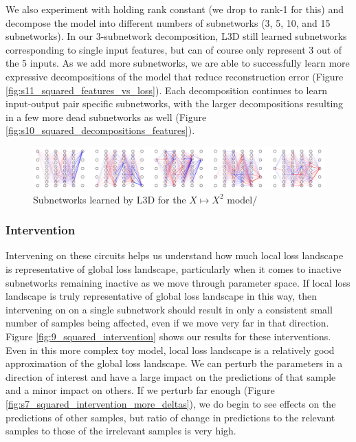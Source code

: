 \documentclass{article}
\theoremstyle{plain}
\theoremstyle{definition}
\theoremstyle{remark}
\begin{document}
We also experiment with holding rank constant (we drop to rank-1 for this) and decompose the model into different numbers of subnetworks (3, 5, 10, and 15 subnetworks). In our 3-subnetwork decomposition, L3D still learned subnetworks corresponding to single input features, but can of course only represent 3 out of the 5 inputs. As we add more subnetworks, we are able to successfully learn more expressive decompositions of the model that reduce reconstruction error (Figure \ref{fig:s11_squared_features_vs_loss}). Each decomposition continues to learn input-output pair specific subnetworks, with the larger decompositions resulting in a few more dead subnetworks as well (Figure \ref{fig:s10_squared_decompositions_features}).

\begin{figure}[htbp]
    \centerline{\includegraphics[width=\textwidth]{../figures/8_squared_subnetworks.pdf}}
    \centering
    \caption{Subnetworks learned by L3D for the $X \mapsto X^2$ model/}\label{fig:8_squared_subnetworks}
\end{figure}


\subsubsection{Intervention}

Intervening on these circuits helps us understand how much local loss landscape is representative of global loss landscape, particularly when it comes to inactive subnetworks remaining inactive as we move through parameter space. If local loss landscape is truly representative of global loss landscape in this way, then intervening on on a single subnetwork should result in only a consistent small number of samples being affected, even if we move very far in that direction. Figure \ref{fig:9_squared_intervention} shows our results for these interventions. Even in this more complex toy model, local loss landscape is a relatively good approximation of the global loss landscape. We can perturb the parameters in a direction of interest and have a large impact on the predictions of that sample and a minor impact on others. If we perturb far enough (Figure \ref{fig:s7_squared_intervention_more_deltas}), we do begin to see effects on the predictions of other samples, but ratio of change in predictions to the relevant samples to those of the irrelevant samples is very high.
\end{document}
